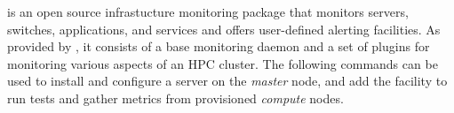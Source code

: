 \Nagios{} is an open source infrastucture monitoring package that monitors
servers, switches, applications, and services and offers user-defined alerting
facilities. As provided by \FSP{}, it consists of a base monitoring daemon and
a set of plugins for monitoring various aspects of an HPC cluster.  The
following commands can be used to install and configure a \Nagios{} server on the {\em
master} node, and add the facility to run tests and gather metrics from
provisioned {\em compute} nodes.
